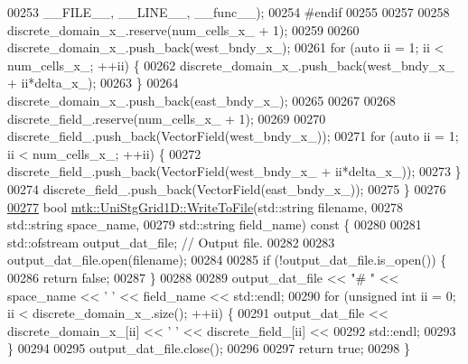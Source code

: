 \begin{DoxyCode}
00253                       \_\_FILE\_\_, \_\_LINE\_\_, \_\_func\_\_);
00254 \textcolor{preprocessor}{  #endif}
00255 
00257 
00258   discrete\_domain\_x\_.reserve(num\_cells\_x\_ + 1);
00259 
00260   discrete\_domain\_x\_.push\_back(west\_bndy\_x\_);
00261   \textcolor{keywordflow}{for} (\textcolor{keyword}{auto} ii = 1; ii < num\_cells\_x\_; ++ii) \{
00262     discrete\_domain\_x\_.push\_back(west\_bndy\_x\_ + ii*delta\_x\_);
00263   \}
00264   discrete\_domain\_x\_.push\_back(east\_bndy\_x\_);
00265 
00267 
00268   discrete\_field\_.reserve(num\_cells\_x\_ + 1);
00269 
00270   discrete\_field\_.push\_back(VectorField(west\_bndy\_x\_));
00271   \textcolor{keywordflow}{for} (\textcolor{keyword}{auto} ii = 1; ii < num\_cells\_x\_; ++ii) \{
00272     discrete\_field\_.push\_back(VectorField(west\_bndy\_x\_ + ii*delta\_x\_));
00273   \}
00274   discrete\_field\_.push\_back(VectorField(east\_bndy\_x\_));
00275 \}
00276 
\hypertarget{mtk__uni__stg__grid__1d_8cc_source_l00277}{}\hyperlink{classmtk_1_1UniStgGrid1D_a6d2c10aa9468a037829f0eb043b898dc}{00277} \textcolor{keywordtype}{bool} \hyperlink{classmtk_1_1UniStgGrid1D_a6d2c10aa9468a037829f0eb043b898dc}{mtk::UniStgGrid1D::WriteToFile}(std::string filename,
00278                                     std::string space\_name,
00279                                     std::string field\_name)\textcolor{keyword}{ const }\{
00280 
00281   std::ofstream output\_dat\_file;  \textcolor{comment}{// Output file.}
00282 
00283   output\_dat\_file.open(filename);
00284 
00285   \textcolor{keywordflow}{if} (!output\_dat\_file.is\_open()) \{
00286     \textcolor{keywordflow}{return} \textcolor{keyword}{false};
00287   \}
00288 
00289   output\_dat\_file << \textcolor{stringliteral}{"# "} << space\_name <<  \textcolor{charliteral}{' '} << field\_name << std::endl;
00290   \textcolor{keywordflow}{for} (\textcolor{keywordtype}{unsigned} \textcolor{keywordtype}{int} ii = 0; ii < discrete\_domain\_x\_.size(); ++ii) \{
00291     output\_dat\_file << discrete\_domain\_x\_[ii] << \textcolor{charliteral}{' '} << discrete\_field\_[ii] <<
00292       std::endl;
00293   \}
00294 
00295   output\_dat\_file.close();
00296 
00297   \textcolor{keywordflow}{return} \textcolor{keyword}{true};
00298 \}
\end{DoxyCode}
